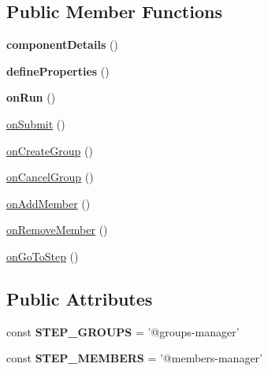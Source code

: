 \subsection*{Public Member Functions}
\begin{DoxyCompactItemize}
\item 
\hypertarget{classDMA_1_1Friends_1_1Components_1_1GroupManager_a060db8751d55b0068666951f864263b3}{{\bfseries component\+Details} ()}\label{classDMA_1_1Friends_1_1Components_1_1GroupManager_a060db8751d55b0068666951f864263b3}

\item 
\hypertarget{classDMA_1_1Friends_1_1Components_1_1GroupManager_a4837e1df34761838844262791e1c1d6b}{{\bfseries define\+Properties} ()}\label{classDMA_1_1Friends_1_1Components_1_1GroupManager_a4837e1df34761838844262791e1c1d6b}

\item 
\hypertarget{classDMA_1_1Friends_1_1Components_1_1GroupManager_ad956ddad7b4f23cfc2111bbe97d40c77}{{\bfseries on\+Run} ()}\label{classDMA_1_1Friends_1_1Components_1_1GroupManager_ad956ddad7b4f23cfc2111bbe97d40c77}

\item 
\hyperlink{classDMA_1_1Friends_1_1Components_1_1GroupManager_ab676c63165e8a5ac01b8c7e6630f187f}{on\+Submit} ()
\item 
\hyperlink{classDMA_1_1Friends_1_1Components_1_1GroupManager_a1022b6c4b9d4a31cf1b41d15ba13ab1f}{on\+Create\+Group} ()
\item 
\hyperlink{classDMA_1_1Friends_1_1Components_1_1GroupManager_a7cec31625dfe221d62d620a078883815}{on\+Cancel\+Group} ()
\item 
\hyperlink{classDMA_1_1Friends_1_1Components_1_1GroupManager_ac0784d39e4fe94f792bec571cec1b202}{on\+Add\+Member} ()
\item 
\hyperlink{classDMA_1_1Friends_1_1Components_1_1GroupManager_a66ab56b50c4bc943aad47bc5fdd33789}{on\+Remove\+Member} ()
\item 
\hyperlink{classDMA_1_1Friends_1_1Components_1_1GroupManager_a852933111a787d927fc27d3f9465cd07}{on\+Go\+To\+Step} ()
\end{DoxyCompactItemize}
\subsection*{Public Attributes}
\begin{DoxyCompactItemize}
\item 
\hypertarget{classDMA_1_1Friends_1_1Components_1_1GroupManager_a0f7f7beaddfc56dc358a16414e86c81c}{const {\bfseries S\+T\+E\+P\+\_\+\+G\+R\+O\+U\+P\+S} = '@groups-\/manager'}\label{classDMA_1_1Friends_1_1Components_1_1GroupManager_a0f7f7beaddfc56dc358a16414e86c81c}

\item 
\hypertarget{classDMA_1_1Friends_1_1Components_1_1GroupManager_af8042daa037d008291e60d95f037707f}{const {\bfseries S\+T\+E\+P\+\_\+\+M\+E\+M\+B\+E\+R\+S} = '@members-\/manager'}\label{classDMA_1_1Friends_1_1Components_1_1GroupManager_af8042daa037d008291e60d95f037707f}

\end{DoxyCompactItemize}
